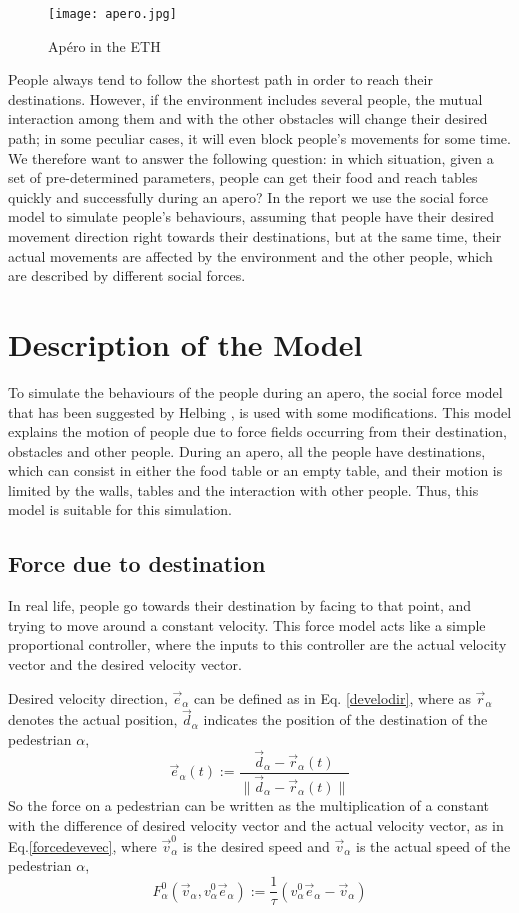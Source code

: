 \documentclass[11pt]{article}
\begin{document}
\begin{figure}[h!]
\centering
\texttt{[image: apero.jpg]}
\caption{Apéro in the ETH}
\label{fig:apero}
\end{figure}

People always tend to follow the shortest path in order to reach their destinations. However, if the environment includes several people, the mutual interaction among them and with the other obstacles will change their desired path; in some peculiar cases, it will even block people's movements for some time. We therefore want to answer the following question: in which situation, given a set of pre-determined parameters, people can get their food and reach tables quickly and successfully during an apero? 
In the report we use the social force model to simulate people's behaviours, assuming that people have their desired movement direction right towards their destinations, but at the same time, their actual movements are affected by the environment and the other people, which are described by different social forces.
\section{Description of the Model}
To simulate the behaviours of the people during an apero, the social force model that has been suggested by Helbing \cite{Socialforce}, is used with some modifications. This model explains the motion of people due to force fields occurring from their destination, obstacles and other people. During an apero, all the people have destinations, which can consist in either the food table or an empty table, and their motion is limited by the walls, tables and the interaction with other people. Thus, this model is suitable for this simulation.
\subsection{Force due to destination}
In real life, people go towards their destination by facing to that point, and trying to move around a constant velocity. This force model acts like a simple proportional controller, where the inputs to this controller are the actual velocity vector and the desired velocity vector.

Desired velocity direction, $\vec{e}_\alpha$ can be defined as in Eq. \ref{develodir}, where as $\vec{r}_\alpha$ denotes the actual position,  $\vec{d}_\alpha$ indicates the position of the destination of the pedestrian $\alpha$,
\begin{equation}
    \vec{e}_\alpha(t):=\frac{\vec{d}_\alpha-\vec{r}_\alpha(t)}{\| \vec{d}_\alpha-\vec{r}_\alpha(t) \|}
\label{develodir}
\end{equation}
So the force on a pedestrian can be written as the multiplication of a constant with the difference of desired velocity vector and the actual velocity vector, as in Eq.\ref{forcedevevec}, where $\vec{v}_\alpha^0$ is the desired speed and $\vec{v}_\alpha$ is the actual speed of the pedestrian $\alpha$,
\begin{equation}
    F_\alpha^0(\vec{v}_\alpha,v_\alpha^0\vec{e}_\alpha) := \frac{1}{\tau}(v_\alpha^0\vec{e}_\alpha-\vec{v}_\alpha)
\label{forcedevevec}
\end{equation}
\end{document}
